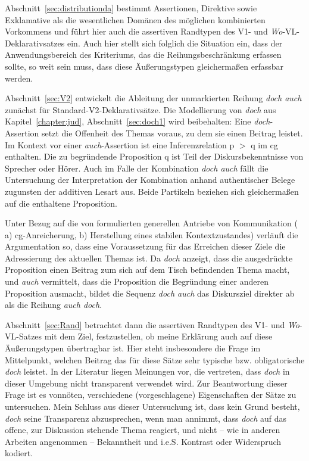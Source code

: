 Abschnitt~\ref{sec:distributionda} bestimmt Assertionen, Direktive sowie Exklamative als die wesent\-lichen Domänen des möglichen kombinierten Vorkommens und führt hier auch die assertiven Randtypen   des V1- und \textit{Wo}-VL-Deklarativsatzes ein. Auch hier stellt sich folglich die Situation ein, dass der Anwendungsbereich des Kriteriums, das die Reihungsbeschränkung erfassen sollte, so weit sein muss, dass diese Äußerungs\-typen gleichermaßen erfassbar werden.

Abschnitt~\ref{sec:V2} entwickelt die Ableitung der unmarkierten Reihung \textit{doch auch} zunächst für Standard-V2-Deklarativsätze. Die Modellierung von \textit{doch} aus Kapitel~\ref{chapter:jud}, Abschnitt~\ref{sec:doch1} wird beibehalten: Eine \textit{doch}-Assertion setzt die Offenheit des Themas voraus, zu dem sie einen Beitrag leistet. Im Kontext vor einer \textit{auch}-Assertion ist eine  Inferenzrelation p $>$ q im cg enthalten. Die zu begründende Proposition q ist Teil der Diskursbekenntnisse von Sprecher oder Hörer. Auch im Falle der Kombination \textit{doch auch} fällt die Untersuchung der Interpretation der Kombination anhand authentischer Belege zugunsten der additiven Lesart aus. Beide Partikeln beziehen sich gleichermaßen auf die enthaltene Proposition.

Unter Bezug auf die von \citet{Farkas2010} formulierten generellen Antriebe von Kommunikation ( a) cg-Anreicherung, b) Herstellung eines stabilen Kontextzustandes) verläuft die Argumentation so, dass eine Voraussetzung für das Erreichen dieser Ziele die Adressierung des aktuellen Themas ist. Da \textit{doch} anzeigt, dass die ausgedrückte Proposition einen Beitrag zum sich auf dem Tisch be\-findenden Thema macht, und \textit{auch} vermittelt, dass die Proposition die Begründung einer anderen Proposition ausmacht, bildet die Sequenz \textit{doch auch} das Diskurs\-ziel direkter ab als die Reihung \textit{auch doch}. 

Abschnitt~\ref{sec:Rand} betrachtet dann die assertiven Randtypen des V1- und \textit{Wo}-VL-Satzes mit dem Ziel, festzustellen, ob meine Erklärung auch auf diese Äußerungs\-typen übertragbar ist. Hier steht insbesondere die Frage im Mittelpunkt, welchen Beitrag das für diese Sätze sehr typische bzw. obligatorische \textit{doch} leistet. In der Litera\-tur liegen Meinungen vor, die vertreten, dass \textit{doch} in dieser Umgebung nicht transparent verwendet wird. Zur Beantwortung dieser Frage ist es vonnöten, verschiedene (vorgeschlagene) Eigenschaften der Sätze zu untersuchen. Mein Schluss aus dieser Untersuchung ist, dass kein Grund besteht, \textit{doch} seine Transparenz abzusprechen, wenn man annimmt, dass \textit{doch} auf das offene, zur Diskussion stehende Thema reagiert, und nicht – wie in anderen Arbeiten angenommen – Bekanntheit und i.e.S. Kontrast oder Widerspruch kodiert.

